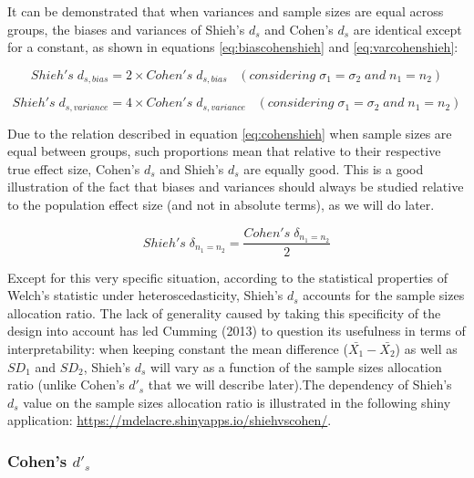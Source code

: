 \documentclass[
  man,floatsintext]{apa6}
\begin{document}
It can be demonstrated that when variances and sample sizes are equal across groups, the biases and variances of Shieh's \(d_s\) and Cohen's \(d_s\) are identical except for a constant, as shown in equations \ref{eq:biascohenshieh} and \ref{eq:varcohenshieh}:

\begin{equation} 
Shieh's \; d_{s,bias} = 2 \times Cohen's \; d_{s,bias} \;\;\;(considering \; \sigma_1 = \sigma_2 \; and \; n_1 = n_2)
\label{eq:biascohenshieh}
\end{equation}

\begin{equation} 
Shieh's \; d_{s,variance} = 4 \times Cohen's \; d_{s,variance} \;\;\;(considering \; \sigma_1 = \sigma_2 \; and \; n_1 = n_2)
\label{eq:varcohenshieh}
\end{equation}

Due to the relation described in equation \ref{eq:cohenshieh} when sample sizes are equal between groups, such proportions mean that relative to their respective true effect size, Cohen's \(d_s\) and Shieh's \(d_s\) are equally good. This is a good illustration of the fact that biases and variances should always be studied relative to the population effect size (and not in absolute terms), as we will do later.

\begin{equation} 
Shieh's \; \delta_{n_1=n_2}= \frac{Cohen's \; \delta_{n_1=n_2}}{2}
\label{eq:cohenshieh}
\end{equation}

Except for this very specific situation, according to the statistical properties of Welch's statistic under heteroscedasticity, Shieh's \(d_s\) accounts for the sample sizes allocation ratio. The lack of generality caused by taking this specificity of the design into account has led Cumming (2013) to question its usefulness in terms of interpretability: when keeping constant the mean difference (\(\bar{X_1}-\bar{X_2}\)) as well as \(SD_1\) and \(SD_2\), Shieh's \(d_s\) will vary as a function of the sample sizes allocation ratio (unlike Cohen's \(d'_s\) that we will describe later).The dependency of Shieh's \(d_s\) value on the sample sizes allocation ratio is illustrated in the following shiny application: \url{https://mdelacre.shinyapps.io/shiehvscohen/}.

\hypertarget{cohens-d_s}{%
\subsubsection{\texorpdfstring{Cohen's \(d'_s\)}{Cohen's d'\_s}}\label{cohens-d_s}}
\end{document}

